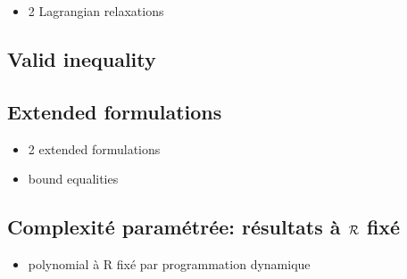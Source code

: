 \begin{itemize}
  \item 2 Lagrangian relaxations
\end{itemize}


\subsection{Valid inequality}


\subsection{Extended formulations}

\begin{itemize}
  \item 2 extended formulations
  \item bound equalities
\end{itemize}


\subsection{Complexité paramétrée: résultats à $\mathcal{R}$ fixé}


\begin{itemize}
  \item polynomial à R fixé par programmation dynamique
\end{itemize}
